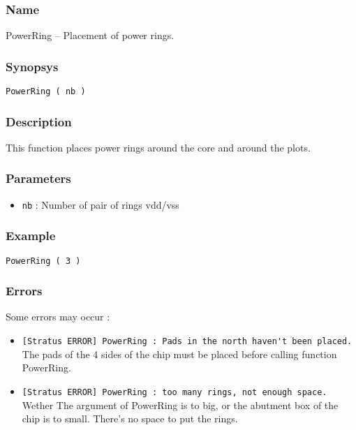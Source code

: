 \subsubsection{Name}

PowerRing -- Placement of power rings.

\subsubsection{Synopsys}

\begin{verbatim}
PowerRing ( nb )
\end{verbatim}

\subsubsection{Description}

This function places power rings around the core and around the plots.
    
\subsubsection{Parameters}

\begin{itemize}
    \item \verb-nb- : Number of pair of rings vdd/vss 
\end{itemize}
    
\subsubsection{Example}

\begin{verbatim}
PowerRing ( 3 )
\end{verbatim}

\subsubsection{Errors}
    
Some errors may occur :
\begin{itemize}
    \item \verb-[Stratus ERROR] PowerRing : Pads in the north haven't been placed.-\\The pads of the 4 sides of the chip must be placed before calling function PowerRing.
    \item \verb-[Stratus ERROR] PowerRing : too many rings, not enough space.-\\Wether The argument of PowerRing is to big,  or the abutment box of the chip is to small. There's no space to put the rings.
\end{itemize}

